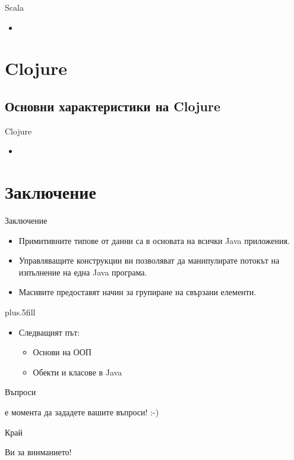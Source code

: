 \documentclass[compress,red]{beamer}
\begin{document}
\begin{frame}{Scala}
  \transdissolve
  \begin{itemize}
  \item 
  \end{itemize}
\end{frame}


\section{Clojure}
\subsection{Основни характеристики на Clojure}
\begin{frame}{Clojure}
  \transdissolve
  \begin{itemize}
  \item 
  \end{itemize}
\end{frame}


\section{Заключение}

\begin{frame}{Заключение}
  \transdissolve
  \begin{itemize}
  \item
    Примитивните типове от данни са в основата на \alert{всички} Java приложения.
  \item
    Управляващите конструкции ви позволяват да манипулирате потокът на
    изпълнение на една Java програма.
  \item
    Масивите предоставят начин за групиране на свързани елементи.
  \end{itemize}
  
  \vskip0pt plus.5fill
  \begin{itemize}
  \item
    Следващият път:
    \begin{itemize}
    \item
      Основи на ООП
    \item
      Обекти и класове в Java
    \end{itemize}
  \end{itemize}
\end{frame}


\begin{frame}{Въпроси}
  \transdissolve
  \begin{center}
     е момента да зададете вашите въпроси! :-)
  \end{center}
\end{frame}


\begin{frame}{Край}
  \transdissolve
  \begin{center}
     Ви за вниманието!
  \end{center}
  
\end{frame}
\end{document}
